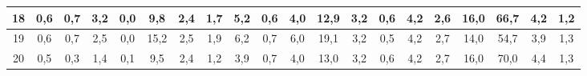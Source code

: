 \begin{sidewaystable}[]
\begin{tabular}{|c|c|c|c|c|c|c|c|c|c|c|c|c|c|c|c|c|c|c|c|}
    18 & 0,6                                             & 0,7                                             & 3,2                                             & 0,0                                             & 9,8                                              & 2,4                                              & 1,7                                              & 5,2                                              & 0,6                                              & 4,0                                              & 12,9                                             & 3,2                                              & 0,6                                              & 4,2                                              & 2,6                                              & 16,0                                             & 66,7                                             & 4,2                                              & 1,2                                              \\ \hline
    19 & 0,6                                             & 0,7                                             & 2,5                                             & 0,0                                             & 15,2                                             & 2,5                                              & 1,9                                              & 6,2                                              & 0,7                                              & 6,0                                              & 19,1                                             & 3,2                                              & 0,5                                              & 4,2                                              & 2,7                                              & 14,0                                             & 54,7                                             & 3,9                                              & 1,3                                              \\ \hline
    20 & 0,5                                             & 0,3                                             & 1,4                                             & 0,1                                             & 9,5                                              & 2,4                                              & 1,2                                              & 3,9                                              & 0,7                                              & 4,0                                              & 13,0                                             & 3,2                                              & 0,6                                              & 4,2                                              & 2,7                                              & 16,0                                             & 70,0                                             & 4,4                                              & 1,3                                              \\ \hline

\end{tabular}
\end{sidewaystable}
